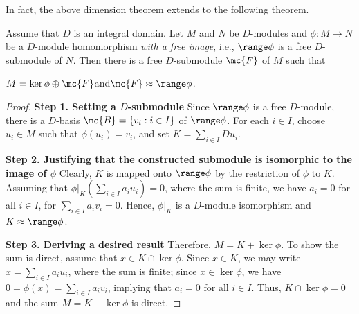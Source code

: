 In fact, the above dimension theorem extends to the following theorem.
\begin{thm}\label{domain-kernel-free_image}
    Assume that $D$ is an integral domain.
    Let $M$ and $N$ be $D$-modules and $\phi: M\rightarrow N$ be a $D$-module homomorphism \textit{with a free image}, i.e., $\range\phi$ is a free $D$-submodule of $N$.
    Then there is a free $D$-submodule $\mc{F}$ of $M$ such that
    \begin{center}
        $M=\ker\phi\oplus\mc{F}$\quad and\quad $\mc{F}\approx \range\phi$.
    \end{center}
\end{thm}
\begin{proof}
    \textbf{Step 1. Setting a $D$-submodule}\newline\indent
    Since $\range\phi$ is a free $D$-module, there is a $D$-basis $\mc{B}=\{v_i: i\in I\}$ of $\range\phi$.
    For each $i\in I$, choose $u_i\in M$ such that $\phi(u_i)=v_i$, and set $K=\sum_{i\in I} Du_i$.

    \textbf{Step 2. Justifying that the constructed submodule is isomorphic to the image of $\phi$}\newline\indent
    Clearly, $K$ is mapped onto $\range\phi$ by the restriction of $\phi$ to $K$.
    Assuming that $\phi|_K(\sum_{i\in I}a_iu_i)=0$, where the sum is finite, we have $a_i=0$ for all $i\in I$, for $\sum_{i\in I}a_iv_i=0$.
    Hence, $\phi|_K$ is a $D$-module isomorphism and $K\approx\range\phi$.

    \textbf{Step 3. Deriving a desired result}\newline\indent
    Therefore, $M=K+\ker\phi$.
    To show the sum is direct, assume that $x\in K\cap\ker\phi$.
    Since $x\in K$, we may write $x=\sum_{i\in I}a_iu_i$, where the sum is finite; since $x\in\ker\phi$, we have $0=\phi(x)=\sum_{i\in I}a_iv_i$, implying that $a_i=0$ for all $i\in I$.
    Thus, $K\cap\ker\phi=0$ and the sum $M=K+\ker\phi$ is direct.
\end{proof}

